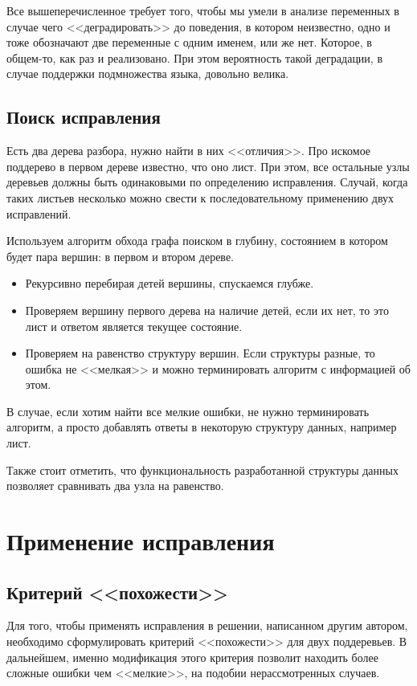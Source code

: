 Все вышеперечисленное требует того, чтобы мы умели в анализе
переменных в случае чего <<деградировать>> до поведения, в котором
неизвестно, одно и тоже обозначают две переменные с одним именем, или
же нет. Которое, в общем-то, как раз и реализовано. При этом
вероятность такой деградации, в случае поддержки подмножества языка,
довольно велика.

\subsection{Поиск исправления}

Есть два дерева разбора, нужно найти в них <<отличия>>. Про искомое поддерево в первом дереве известно, что оно лист.
При этом, все остальные узлы деревьев должны быть одинаковыми по определению исправления. Случай, когда таких листьев
несколько можно свести к последовательному применению двух исправлений.

Используем алгоритм обхода графа поиском в глубину, состоянием в котором будет пара вершин: в первом и втором дереве.
\begin{itemize}
\item Рекурсивно перебирая детей вершины, спускаемся глубже.
\item Проверяем вершину первого дерева на наличие детей, если их нет, то это лист и ответом является текущее состояние.
\item Проверяем на равенство структуру вершин. Если структуры разные, то ошибка не <<мелкая>> и можно терминировать алгоритм
    с информацией об этом.
\end{itemize}

В случае, если хотим найти все мелкие ошибки, не нужно терминировать алгоритм, а просто добавлять ответы в некоторую структуру данных,
например лист.

Также стоит отметить, что функциональность разработанной структуры данных позволяет сравнивать два узла на равенство.

\section{Применение исправления}

\subsection{Критерий <<похожести>>}
Для того, чтобы применять исправления в решении, написанном другим автором, необходимо сформулировать критерий <<похожести>>
для двух поддеревьев. В дальнейшем, именно модификация этого критерия позволит находить более сложные ошибки чем <<мелкие>>,
на подобии нерассмотренных случаев.


